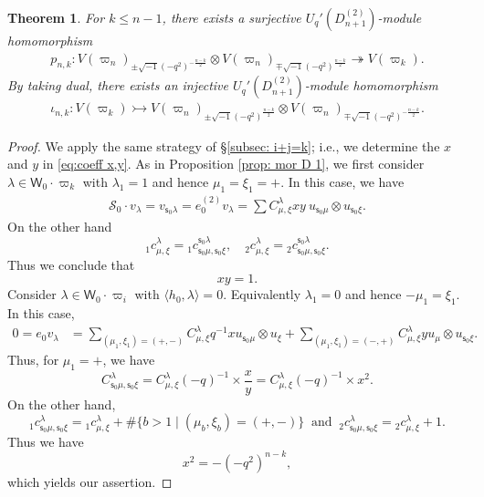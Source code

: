 \documentclass[11pt, leqno]{amsart}
\newtheorem{theorem}{Theorem}[section]
\theoremstyle{definition}
\numberwithin{equation}{section}
\begin{document}
\begin{theorem} \label{thm: nnk}
For $k \le n-1$, there exists a surjective $U_q'(D^{(2)}_{n+1})$-module homomorphism
\begin{align} \label{eq: p ij 2}
  p_{n,k} \colon V(\varpi_n)_{\pm \sqrt{-1} {(-q^2)}^{-\frac{n-k}{2}}} \otimes V(\varpi_n)_{\mp \sqrt{-1} {(-q^2)}^{\frac{n-k}{2}}}
  \twoheadrightarrow V(\varpi_{k}).
  \end{align}
By taking dual, there exists an injective $U_q'(D^{(2)}_{n+1})$-module homomorphism
\begin{align}\label{eq: iota ij 2}
  \iota_{n,k} \colon V(\varpi_k)  \rightarrowtail V(\varpi_n)_{\pm \sqrt{-1} {(-q^2)}^{\frac{n-k}{2}}}
  \otimes V(\varpi_n)_{\mp \sqrt{-1} {(-q^2)}^{-\frac{n-k}{2}}}.
  \end{align}
\end{theorem}

\begin{proof}
We apply the same strategy of \S \ref{subsec: i+j=k}; i.e., we determine the $x$ and $y$ in \eqref{eq:coeff x,y}. As in Proposition
\ref{prop: mor D 1}, we first consider $\lambda \in \mathsf{W}_0 \cdot {\varpi}_k$ with $\lambda_1=1$ and hence $\mu_1=\xi_1=+$. In this
 case, we have
\begin{align*}
\mathcal{S}_0\cdot v_\lambda=v_{{\mathsf{s}}_0\lambda} =e_0^{(2)} v_\lambda = \sum C^{\lambda}_{\mu,\xi}
xy \ u_{{\mathsf{s}}_0 \mu} \otimes u_{{\mathsf{s}}_0\xi}.
\end{align*}
On the other hand
$${}_1c_{\mu,\xi}^{\lambda}= {}_1c_{{\mathsf{s}}_0\mu,{\mathsf{s}}_0\xi}^{{\mathsf{s}}_0\lambda}, \quad {}_2c_{\mu,\xi}^{\lambda} = {}_2c_{{\mathsf{s}}_0\mu,{\mathsf{s}}_0\xi}^{{\mathsf{s}}_0\lambda}.$$
 Thus we conclude that $$xy=1.$$
 Consider $\lambda \in \mathsf{W}_0 \cdot {\varpi}_{i}$ with $\langle h_0, \lambda \rangle
 =0$. Equivalently $\lambda_1=0$ and hence $-\mu_1=\xi_1$. In this case,
\begin{align*}
0=e_0v_\lambda & =\sum_{(\mu_1,\xi_1)=(+,-)}C_{\mu,\xi}^{\lambda}
q^{-1} x u_{{\mathsf{s}}_0\mu} \otimes u_\xi +
\sum_{(\mu_1,\xi_1)=(-,+)}C_{\mu,\xi}^{\lambda} y u_\mu \otimes
u_{{\mathsf{s}}_0\xi}.
\end{align*}
Thus, for $\mu_1=+$, we have
$$ C_{{\mathsf{s}}_0\mu,{\mathsf{s}}_0\xi}^{\lambda}=C_{\mu,\xi}^{\lambda} (-q)^{-1} \times \dfrac{x}{y} =C_{\mu,\xi}^{\lambda} (-q)^{-1} \times x^2.$$
On the other hand,
$${}_1c^{\lambda}_{{\mathsf{s}}_0\mu,{\mathsf{s}}_0\xi} =  {}_1c^{\lambda}_{\mu,\xi} + \# \{ b > 1 \mid (\mu_b,\xi_b)=(+,-) \} \ \text{ and } \
{}_2c^{\lambda}_{{\mathsf{s}}_0\mu,{\mathsf{s}}_0\xi} = {}_2c^{\lambda}_{\mu,\xi}+1.$$
Thus we have
$$ x^2=-{(-q^2)}^{n-k},$$
which yields our assertion.
\end{proof}
\end{document}

